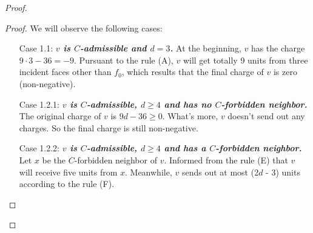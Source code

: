 \begin{proof}
\begin{proof}
We will observe the following cases:
\begin{itemize}
    \item[Case 1.1:] \textit{\textbf{$v$ is $C$-admissible and $d = 3$.}} At the beginning, $v$ has the charge $9 \cdot 3 - 36 = -9$. Pursuant to the rule (A), $v$ will get totally 9 units from three incident faces other than $f_0$, which results that the final charge of $v$ is zero (non-negative).
    \item[Case 1.2.1:] \textit{\textbf{$v$ is $C$-admissible, $d \geq 4$ and has no $C$-forbidden neighbor.}} The original charge of $v$ is $9d - 36 \geq 0$. What's more, $v$ doesn't send out any charges. So the final charge is still non-negative.
    \item[Case 1.2.2:] \textit{\textbf{$v$ is $C$-admissible, $d \geq 4$ and has a $C$-forbidden neighbor.}} Let $x$ be the $C$-forbidden neighbor of $v$. Informed from the rule (E) that $v$ will receive five units from $x$. Meanwhile, $v$ sends out at most (2$d$ - 3) units according to the rule (F).
    

\end{itemize}
\end{proof}
\end{proof}
